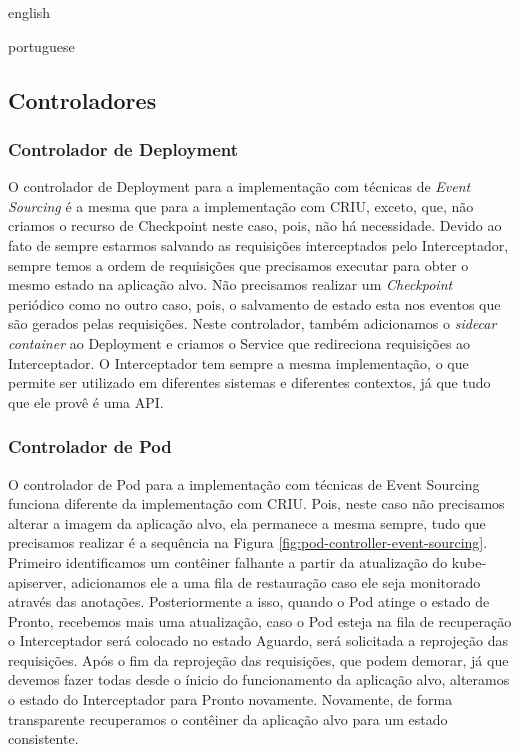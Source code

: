 \begin{otherlanguage*}{english}
\begin{otherlanguage*}{portuguese}
\subsection{Controladores}

\subsubsection{Controlador de Deployment}

O controlador de Deployment para a implementação com técnicas de \textit{Event Sourcing} é
a mesma que para a implementação com CRIU, exceto, que, não criamos o recurso de Checkpoint neste
caso, pois, não há necessidade. Devido ao fato de sempre estarmos salvando as requisições
interceptados pelo Interceptador, sempre temos a ordem de requisições que precisamos
executar para obter o mesmo estado na aplicação alvo. Não precisamos realizar um
\textit{Checkpoint} periódico como no outro caso, pois, o salvamento de estado esta nos
eventos que são gerados pelas requisições. Neste controlador, também adicionamos o 
\textit{sidecar container} ao Deployment e criamos o Service que redireciona requisições
ao Interceptador. O Interceptador tem sempre a mesma implementação, o que permite ser
utilizado em diferentes sistemas e diferentes contextos, já que tudo que ele provê é uma
API.

\subsubsection{Controlador de Pod}

O controlador de Pod para a implementação com técnicas de Event Sourcing funciona
diferente da implementação com CRIU. Pois, neste caso não precisamos alterar a imagem da
aplicação alvo, ela permanece a mesma sempre, tudo que precisamos realizar é a sequência
na Figura \ref{fig:pod-controller-event-sourcing}. Primeiro identificamos um contêiner
falhante a partir da atualização do kube-apiserver, adicionamos ele a uma fila de
restauração caso ele seja monitorado através das anotações. Posteriormente a isso, quando
o Pod atinge o estado de Pronto, recebemos mais uma atualização, caso o Pod esteja na
fila de recuperação o Interceptador será colocado no estado Aguardo, será solicitada a
reprojeção das requisições. Após o fim da reprojeção das requisições, que podem demorar,
já que devemos fazer todas desde o ínicio do funcionamento da aplicação alvo, alteramos
o estado do Interceptador para Pronto novamente. Novamente, de forma transparente
recuperamos o contêiner da aplicação alvo para um estado consistente.


\end{otherlanguage*}
\end{otherlanguage*}
